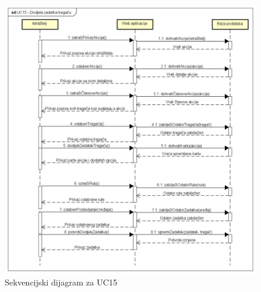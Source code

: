				\eject
				
				\begin{figure}[H]
					\includegraphics[scale=0.6]{dijagrami/UC15-Dodjela zadatka tragaču} 
					\centering
					\caption{Sekvencijski dijagram za UC15}
					\label{fig:promjene}
				\end{figure}
				
				\eject
				
				
